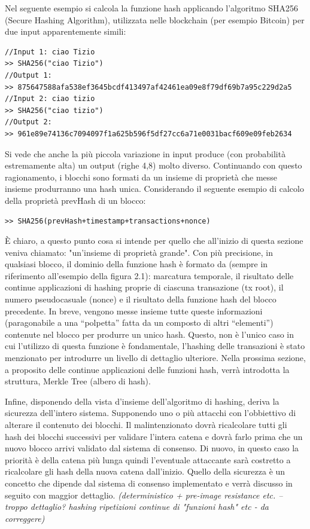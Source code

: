 Nel seguente esempio si calcola la funzione hash applicando l'algoritmo SHA256 (Secure Hashing Algorithm), utilizzata nelle blockchain (per esempio Bitcoin) per due input apparentemente simili: 
\\

\begin{lstlisting}
//Input 1: ciao Tizio
>> SHA256("ciao Tizio")
//Output 1: 
>> 875647588afa538ef3645bcdf413497af42461ea09e8f79df69b7a95c229d2a5
//Input 2: ciao tizio
>> SHA256("ciao tizio")
//Output 2: 
>> 961e89e74136c7094097f1a625b596f5df27cc6a71e0031bacf609e09feb2634
\end{lstlisting}

Si vede che anche la più piccola variazione in input produce (con probabilità estremamente alta) un output (righe 4,8) molto diverso.
Continuando con questo ragionamento, i blocchi sono formati da un insieme di proprietà che messe insieme produrranno una hash unica. Considerando il seguente esempio di calcolo della proprietà prevHash di un blocco:
\\
\begin{lstlisting}
>> SHA256(prevHash+timestamp+transactions+nonce)
\end{lstlisting}

È chiaro, a questo punto cosa si intende per quello che all'inizio di questa sezione veniva chiamato: "un'insieme di proprietà grande". Con più precisione, in qualsiasi blocco, il dominio della funzione hash è formato da (sempre in riferimento all'esempio della figura 2.1): marcatura temporale, il risultato delle continue applicazioni di hashing proprie di ciascuna transazione (tx root), il numero pseudocasuale (nonce) e il risultato della funzione hash del blocco precedente. In breve, vengono messe insieme tutte queste informazioni (paragonabile a una “polpetta” fatta da un composto di altri “elementi”) contenute nel blocco per produrre un unico hash. Questo, non è l'unico caso in cui l'utilizzo di questa funzione è fondamentale, l'hashing delle transazioni è stato menzionato per introdurre un livello di dettaglio ulteriore. Nella prossima sezione, a proposito delle continue applicazioni delle funzioni hash, verrà introdotta la struttura, Merkle Tree (albero di hash). 

Infine, disponendo della vista d'insieme dell'algoritmo di hashing, deriva la sicurezza dell'intero sistema. Supponendo uno o più attacchi con l'obbiettivo di alterare il contenuto dei blocchi. Il malintenzionato dovrà ricalcolare tutti gli hash dei blocchi successivi per validare l'intera catena e dovrà farlo prima che un nuovo blocco arrivi validato dal sistema di consenso. Di nuovo, in questo caso la priorità è della catena più lunga quindi l’eventuale attaccante sarà costretto a ricalcolare gli hash della nuova catena dall’inizio. Quello della sicurezza è un concetto che dipende dal sistema di consenso implementato e verrà discusso in seguito con maggior dettaglio.
\textit{(deterministico + pre-image resistance etc. – troppo dettaglio? hashing ripetizioni continue di "funzioni hash" etc - da correggere) }



